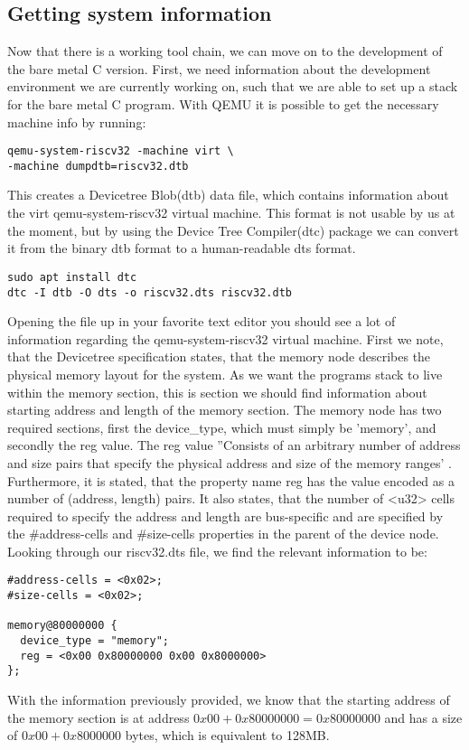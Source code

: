 \subsection{Getting system information}\label{sec:sys-info}
Now that there is a working tool chain, we can move on to the development of the
bare metal C version. First, we need information about the development
environment we are currently working on, such that we are able to set up a stack
for the bare metal C program. With QEMU it is possible to get the necessary
machine info by running:
\begin{lstlisting}
qemu-system-riscv32 -machine virt \
-machine dumpdtb=riscv32.dtb
\end{lstlisting}
This creates a Devicetree Blob(dtb) data file, which contains information about
the virt qemu-system-riscv32 virtual machine. This format is not usable by us
at the moment, but by using the Device Tree Compiler(dtc) package we can convert
it from the binary dtb format to a human-readable dts format.
\begin{lstlisting}
sudo apt install dtc
dtc -I dtb -O dts -o riscv32.dts riscv32.dtb
\end{lstlisting}
Opening the file up in your favorite text editor you should see a lot of
information regarding the qemu-system-riscv32 virtual machine. First we note,
that the Devicetree specification states, that the memory node describes the
physical memory layout for the system. As we want the programs stack
to live within the memory section, this is section we should find information
about starting address and length of the memory section. The memory node has
two required sections, first the device\_type, which must simply be 'memory', and
secondly the reg value. The reg value ''Consists of an arbitrary number of
address and size pairs that specify the physical address and size of the memory
ranges' \cite{DTS}. Furthermore, it is stated, that the property name reg has
the value encoded as a number of (address, length) pairs. It also states, that
the number of <u32> cells required to specify the address and length are
bus-specific and are specified by the \#address-cells and \#size-cells properties
in the parent of the device node.
Looking through our riscv32.dts file, we find the relevant information to be:
\begin{lstlisting}
#address-cells = <0x02>;
#size-cells = <0x02>;

memory@80000000 {
  device_type = "memory";
  reg = <0x00 0x80000000 0x00 0x8000000>
};
\end{lstlisting}
With the information previously provided, we know that the starting
address of the memory section is at address $0x00 + 0x80000000 = 0x80000000$ and has a size of
$0x00 + 0x8000000$ bytes, which is equivalent to 128MB.

